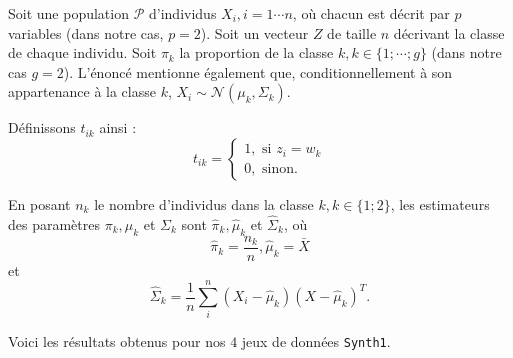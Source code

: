 \documentclass{article}
\begin{document}
\begin{multicols}{2}
Soit une population $\mathcal{P}$ d'individus $X_i, i=1 \cdots n$, où chacun est décrit par $p$ variables (dans notre cas, $p=2$). Soit un vecteur $Z$ de taille $n$ décrivant la classe de chaque individu. Soit $\pi_k$ la proportion de la classe $k, k \in \{1; \cdots; g \}$ (dans notre cas $g = 2$). L'énoncé mentionne également que, conditionnellement à son appartenance à la classe $k$, $X_i \sim \mathcal{N}(\mu_k, \Sigma_k).$ 

Définissons $t_{ik}$ ainsi :
\[
t_{ik} = 
\left\{ 
\begin{array}{l}
1, \text{\ si \ } z_i = w_k \\
0, \text{\ sinon.} 
\end{array}
\right.
\]

En posant $n_k$ le nombre d'individus dans la classe $k, k \in \{1; 2 \}$, les estimateurs des paramètres $\pi_k, \mu_k$ et $\Sigma_k$ sont $\widehat{\pi}_k, \widehat{\mu}_k$ et $\widehat{\Sigma}_k$, où
\[
\widehat{\pi}_k = \frac{n_k}{n}, \widehat{\mu}_k = \bar{X}
\]
et
\[
\widehat{\Sigma}_k = \frac{1}{n} \sum_i^{n}(X_i - \widehat{\mu}_k)(X - \widehat{\mu}_k)^T .
\]

Voici les résultats obtenus pour nos $4$ jeux de données \texttt{Synth1}.


\end{multicols}
\end{document}
